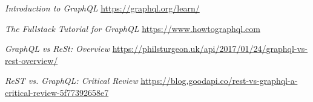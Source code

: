 \documentclass[10pt,journal,compsoc]{IEEEtran}
\begin{document}
%
%
%
\begin{thebibliography}{1}
  
\emph{Introduction to GraphQL}
\url{https://graphql.org/learn/}
  
\emph{The Fullstack Tutorial for GraphQL}
\url{https://www.howtographql.com}

\emph{GraphQL vs ReSt: Overview}
\url{https://philsturgeon.uk/api/2017/01/24/graphql-vs-rest-overview/}

\emph{ReST vs. GraphQL: Critical Review}
\url{https://blog.goodapi.co/rest-vs-graphql-a-critical-review-5f77392658e7}




\end{thebibliography}

% 
\end{document}

